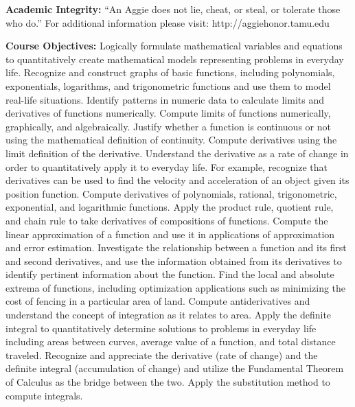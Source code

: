\documentclass[12pt]{article}
\begin{document}
\vspace*{.15in}
\noindent \textbf{Academic Integrity:} “An Aggie does not lie, cheat, or steal, or tolerate those who do.” For additional information please visit: http://aggiehonor.tamu.edu 

\vspace*{.15in}
\noindent \textbf{Course Objectives:}   Logically formulate mathematical variables and equations to quantitatively create mathematical models representing problems in everyday life.  Recognize and construct graphs of basic functions, including polynomials, exponentials, logarithms, and trigonometric functions and use them to model real-life situations.  Identify patterns in numeric data to calculate limits and derivatives of functions numerically.  Compute limits of functions numerically, graphically, and algebraically.  Justify whether a function is continuous or not using the mathematical definition of continuity.  Compute derivatives using the limit definition of the derivative.  Understand the derivative as a rate of change in order to quantitatively apply it to everyday life.  For example, recognize that derivatives can be used to find the velocity and acceleration of an object given its position function.  Compute derivatives of polynomials, rational, trigonometric, exponential, and logarithmic functions.  Apply the product rule, quotient rule, and chain rule to take derivatives of compositions of functions.  Compute the linear approximation of a function and use it in applications of approximation and error estimation.  Investigate the relationship between a function and its first and second derivatives, and use the information obtained from its derivatives to identify pertinent information about the function.  Find the local and absolute extrema of functions, including optimization applications such as minimizing the cost of fencing in a particular area of land.  Compute antiderivatives and understand the concept of integration as it relates to area.  Apply the definite integral to quantitatively determine solutions to problems in everyday life including areas between curves, average value of a function, and total distance traveled.  Recognize and appreciate the derivative (rate of change) and the definite integral (accumulation of change) and utilize the Fundamental Theorem of Calculus as the bridge between the two.   Apply the substitution method to compute integrals. 
\end{document}
